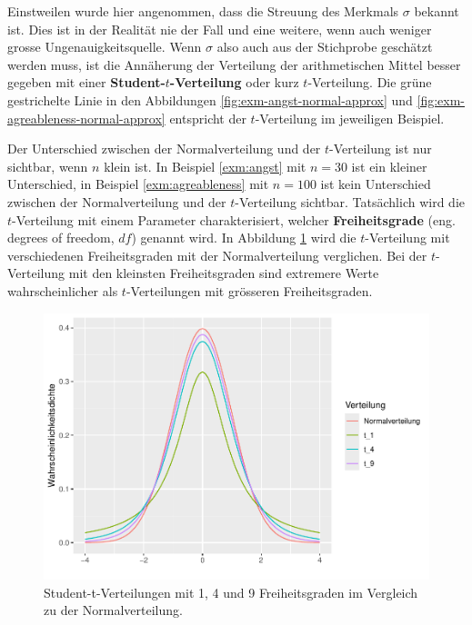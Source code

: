 \documentclass[
]{book}
\theoremstyle{definition}
\theoremstyle{definition}
\theoremstyle{definition}
\theoremstyle{definition}
\theoremstyle{remark}
\begin{document}
Einstweilen wurde hier angenommen, dass die Streuung des Merkmals \(\sigma\) bekannt ist. Dies ist in der Realität nie der Fall und eine weitere, wenn auch weniger grosse Ungenauigkeitsquelle. \label{customdef-student-verteilung}{Wenn \(\sigma\) also auch aus der Stichprobe geschätzt werden muss, ist die Annäherung der Verteilung der arithmetischen Mittel besser gegeben mit einer \textbf{Student-\(t\)-Verteilung} oder kurz \(t\)-Verteilung.} Die grüne gestrichelte Linie in den Abbildungen \ref{fig:exm-angst-normal-approx} und \ref{fig:exm-agreableness-normal-approx} entspricht der \(t\)-Verteilung im jeweiligen Beispiel.

Der Unterschied zwischen der Normalverteilung und der \(t\)-Verteilung ist nur sichtbar, wenn \(n\) klein ist. In Beispiel \ref{exm:angst} mit \(n = 30\) ist ein kleiner Unterschied, in Beispiel \ref{exm:agreableness} mit \(n = 100\) ist kein Unterschied zwischen der Normalverteilung und der \(t\)-Verteilung sichtbar. \label{customdef-freiheitsgrade}{Tatsächlich wird die \(t\)-Verteilung mit einem Parameter charakterisiert, welcher \textbf{Freiheitsgrade} (eng. degrees of freedom, \(df\)) genannt wird.} In Abbildung \ref{fig:t-distribution} wird die \(t\)-Verteilung mit verschiedenen Freiheitsgraden mit der Normalverteilung verglichen. Bei der \(t\)-Verteilung mit den kleinsten Freiheitsgraden sind extremere Werte wahrscheinlicher als \(t\)-Verteilungen mit grösseren Freiheitsgraden.

\begin{figure}
\centering
\includegraphics{aps_statistik1_files/figure-latex/t-distribution-1.pdf}
\caption{\label{fig:t-distribution}Student-t-Verteilungen mit 1, 4 und 9 Freiheitsgraden im Vergleich zu der Normalverteilung.}
\end{figure}
\end{document}
